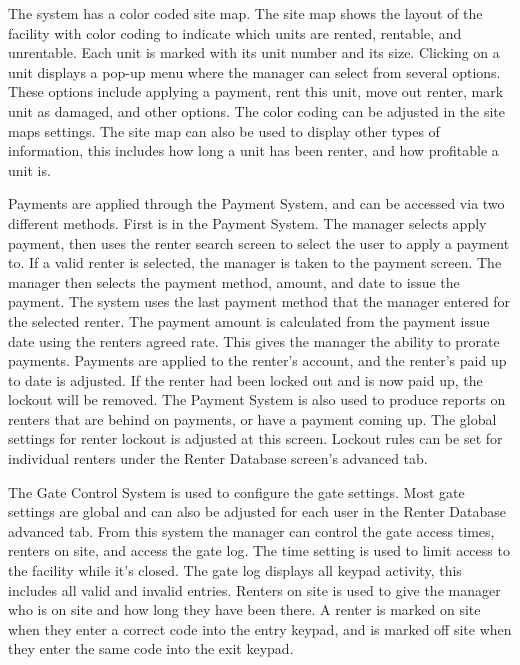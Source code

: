 \documentclass[a4paper,12pt]{report}
\begin{document}
The system has a color coded site map.  The site map shows the layout of the facility with color coding to indicate which units are rented, rentable, and unrentable.  Each unit is marked with its unit number and its size.  Clicking on a unit displays a pop-up menu where the manager can select from several options.  These options include applying a payment, rent this unit, move out renter, mark unit as damaged, and other options.  The color coding can be adjusted in the site maps settings.  The site map can also be used to display other types of information, this includes how long a unit has been renter, and how profitable a unit is. 

Payments are applied through the Payment System, and can be accessed via two different methods.  First is in the Payment System.  The manager selects apply payment, then uses the renter search screen to select the user to apply a payment to.  If a valid renter is selected, the manager is taken to the payment screen.  The manager then selects the payment method, amount, and date to issue the payment.  The system uses the last payment method that the manager entered for the selected renter.  The payment amount is calculated from the payment issue date using the renters agreed rate.  This gives the manager the ability to prorate payments.  Payments are applied to the renter's account, and the renter's paid up to date is adjusted.  If the renter had been locked out and is now paid up, the lockout will be removed.  The Payment System is also used to produce reports on renters that are behind on payments, or have a payment coming up.  The global settings for renter lockout is adjusted at this screen.  Lockout rules can be set for individual renters under the Renter Database screen's advanced tab.
 
The Gate Control System is used to configure the gate settings.  Most gate settings are global and can also be adjusted for each user in the Renter Database advanced tab.  From this system the manager can control the gate access times, renters on site,  and access the gate log.  The time setting is used to limit access to the facility while it's closed.  The gate log displays all keypad activity, this includes all valid and invalid entries.  Renters on site is used to give the manager who is on site and how long they have been there.  A renter is marked on site when they enter a correct code into the entry keypad, and is marked off site when they enter the same code into the exit keypad.
\end{document}

